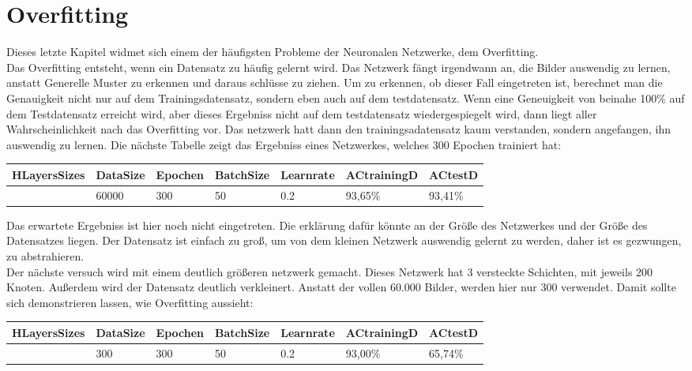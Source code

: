 \documentclass[12pt]{article}
\begin{document}
\section{Overfitting}
Dieses letzte Kapitel widmet sich einem der häufigsten Probleme der Neuronalen Netzwerke, dem Overfitting.\\
Das Overfitting entsteht, wenn ein Datensatz zu häufig gelernt wird. Das Netzwerk fängt irgendwann an, die Bilder auswendig zu lernen, anstatt Generelle Muster zu erkennen und daraus schlüsse zu ziehen. 
Um zu erkennen, ob dieser Fall eingetreten ist, berechnet man die Genauigkeit nicht nur auf dem Trainingsdatensatz, sondern eben auch auf dem testdatensatz. Wenn eine Geneuigkeit von beinahe 100\% auf dem Testdatensatz erreicht wird, aber dieses Ergebniss nicht auf dem testdatensatz wiedergespiegelt wird, dann liegt aller Wahrscheinlichkeit nach das Overfitting vor. Das netzwerk hatt dann den trainingsadatensatz kaum verstanden, sondern angefangen, ihn auswendig zu lernen.
Die nächste Tabelle zeigt das Ergebniss eines Netzwerkes, welches 300 Epochen trainiert hat:

\begin{table}[H]
    \centering
    \begin{tabular}{|l|l|l|l|l|l|l|}
    \hline
        HLayersSizes & DataSize & Epochen & BatchSize & Learnrate & ACtrainingD & ACtestD \\ \hline
        [784, 80, 10] & 60000 & 300 & 50 & 0.2 & 93,65\% & 93,41\% \\ \hline
    \end{tabular}
\end{table}

Das erwartete Ergebniss ist hier noch nicht eingetreten. Die erklärung dafür könnte an der Größe des Netzwerkes und der Größe des Datensatzes liegen. Der Datensatz ist einfach zu groß, um von dem kleinen Netzwerk auswendig gelernt zu werden, daher ist es gezwungen, zu abstrahieren.\\
Der nächste versuch wird mit einem deutlich größeren netzwerk gemacht. Dieses Netzwerk hat 3 versteckte Schichten, mit jeweils 200 Knoten. Außerdem wird der Datensatz deutlich verkleinert. Anstatt der vollen 60.000 Bilder, werden hier nur 300 verwendet. Damit sollte sich demonstrieren lassen, wie Overfitting aussieht:

\begin{table}[H]
    \centering
    \begin{tabular}{|p{}|l|l|l|l|l|l|}
    \hline
        HLayersSizes & DataSize & Epochen & BatchSize & Learnrate & ACtrainingD & ACtestD \\ \hline
        [784, 200, 200, 200, 10] & 300 & 300 & 50 & 0.2 & 93,00\% & 65,74\% \\ \hline
    \end{tabular}
\end{table}
\end{document}
